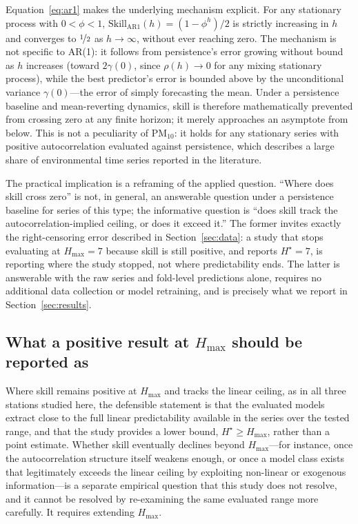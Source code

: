 \documentclass{article}
\newcommand{\hstar}{H^{\star}}
\begin{document}
Equation~\ref{eq:ar1} makes the underlying mechanism explicit.
For any stationary process with $0<\phi<1$,
$\mathrm{Skill}_{\mathrm{AR1}}(h)=(1-\phi^h)/2$ is strictly increasing in $h$
and converges to $\nicefrac{1}{2}$ as $h\to\infty$, without ever reaching
zero.
The mechanism is not specific to AR(1): it follows from persistence's error
growing without bound as $h$ increases (toward $2\gamma(0)$, since $\rho(h)\to
0$ for any mixing stationary process), while the best predictor's error is
bounded above by the unconditional variance $\gamma(0)$---the error of simply
forecasting the mean.
Under a persistence baseline and mean-reverting dynamics, skill is therefore
mathematically prevented from crossing zero at any finite horizon; it merely
approaches an asymptote from below.
This is not a peculiarity of PM$_{10}$: it holds for any stationary series
with positive autocorrelation evaluated against persistence, which describes
a large share of environmental time series reported in the literature.

The practical implication is a reframing of the applied question.
``Where does skill cross zero'' is not, in general, an answerable question
under a persistence baseline for series of this type; the informative
question is ``does skill track the autocorrelation-implied ceiling, or does
it exceed it.''
The former invites exactly the right-censoring error described in
Section~\ref{sec:data}: a study that stops evaluating at $H_{\max}=7$ because
skill is still positive, and reports $\hstar=7$, is reporting where the study
stopped, not where predictability ends.
The latter is answerable with the raw series and fold-level predictions
alone, requires no additional data collection or model retraining, and is
precisely what we report in Section~\ref{sec:results}.

\subsection{What a positive result at $H_{\max}$ should be reported as}

Where skill remains positive at $H_{\max}$ and tracks the linear ceiling, as
in all three stations studied here, the defensible statement is that the
evaluated models extract close to the full linear predictability available in
the series over the tested range, and that the study provides a lower bound,
$\hstar \ge H_{\max}$, rather than a point estimate.
Whether skill eventually declines beyond $H_{\max}$---for instance, once the
autocorrelation structure itself weakens enough, or once a model class exists
that legitimately exceeds the linear ceiling by exploiting non-linear or
exogenous information---is a separate empirical question that this study does
not resolve, and it cannot be resolved by re-examining the same evaluated
range more carefully.
It requires extending $H_{\max}$.
\end{document}

